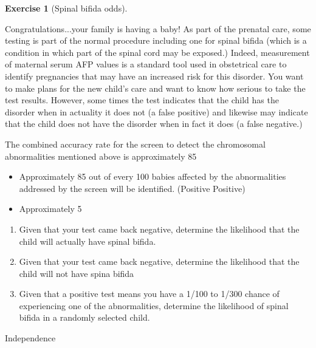 \documentclass[10pt,]{book}
\theoremstyle{plain}
\theoremstyle{definition}
\theoremstyle{definition}
\theoremstyle{definition}
\newtheorem{exercise}[theorem]{Exercise}
\numberwithin{equation}{section}
\begin{document}
\begin{exercise}[{Spinal bifida odds}]\label{exercise-24}

	Congratulations...your family is having a baby! As part of the prenatal care, some testing is part of the normal procedure including one for spinal bifida (which is a condition in which part of the spinal cord may be exposed.) Indeed, measurement of maternal serum AFP values is a standard tool used in obstetrical care to identify pregnancies that may have an increased risk for this disorder. You want to make plans for the new child's care and want to know how serious to take the test results. However, some times the test indicates that the child has the disorder when in actuality it does not (a false positive) and likewise may indicate that the child does not have the disorder when in fact it does (a false negative.) 
\par
The combined accuracy rate for the screen to detect the chromosomal abnormalities mentioned above is approximately 85%
	\leavevmode%
\begin{itemize}[label=\textbullet]
\item{}Approximately 85 out of every 100 babies affected by the abnormalities addressed by the screen will be identified. (Positive Positive)%
\item{}Approximately 5%
\end{itemize}

	\leavevmode%
\begin{enumerate}
\item\hypertarget{li-144}{}Given that your test came back negative, determine the likelihood that the child will actually have spinal bifida.%
\item\hypertarget{li-145}{}Given that your test came back negative, determine the likelihood that the child will not have spina bifida%
\item\hypertarget{li-146}{}Given that a positive test means you have a 1/100 to 1/300 chance of experiencing one of the abnormalities, determine the likelihood of spinal bifida in a randomly selected child.%
\end{enumerate}

\end{exercise}
\par
Independence%
\end{document}
